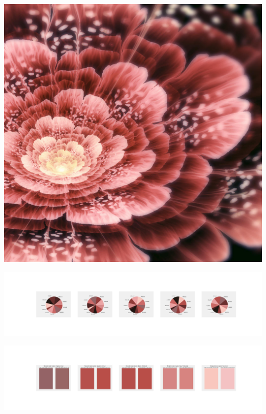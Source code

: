 \documentclass[11pt]{article}
\begin{document}
\begin{landscape}
    \begin{center}
    \includegraphics[width=\textwidth]{./nbimg/file (161).jpg}
    \end{center}

    \begin{center}
    \includegraphics[width=250mm]{./nbimg/pie-69.jpg}
    \end{center}

    \begin{center}
    \includegraphics[width=250mm]{./nbimg/peak-69.jpg}
    \end{center}
    


\end{landscape}
\end{document}
